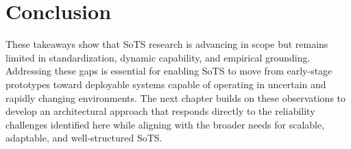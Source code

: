 
\section{Conclusion}
These takeaways show that SoTS research is advancing in scope but remains limited in standardization, dynamic capability, and empirical grounding. Addressing these gaps is essential for enabling SoTS to move from early-stage prototypes toward deployable systems capable of operating in uncertain and rapidly changing environments. The next chapter builds on these observations to develop an architectural approach that responds directly to the reliability challenges identified here while aligning with the broader needs for scalable, adaptable, and well-structured SoTS.
